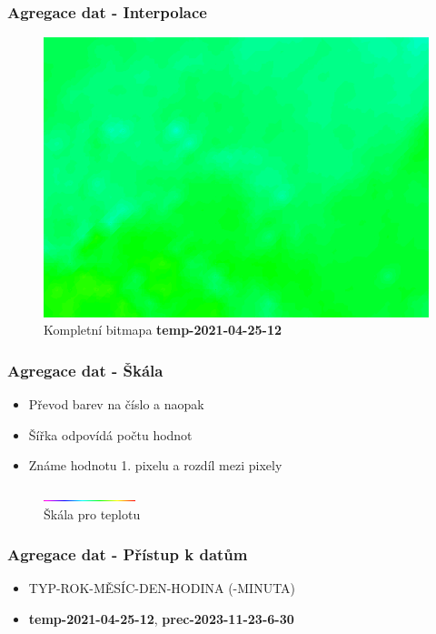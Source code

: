 \documentclass{beamer}
\begin{document}
	\begin{frame}
		\frametitle{Agregace dat - Interpolace}
		
		\begin{figure}
			
			\includegraphics[scale=0.5]{figures/bmp_vybarvena.png}
			\caption{Kompletní bitmapa \textbf{temp-2021-04-25-12}}
			
		\end{figure}
		
	\end{frame}

	\begin{frame}
		\frametitle{Agregace dat - Škála}
		
		\begin{itemize}
			\item Převod barev na číslo a naopak
			\item Šířka odpovídá počtu hodnot
			\item Známe hodnotu 1. pixelu a rozdíl mezi pixely
		\end{itemize}
		
		\begin{figure}
			
			\includegraphics[scale=3]{figures/scale_temp.png}
			\caption{Škála pro teplotu}
			
		\end{figure}
		
	\end{frame}

	\begin{frame}
		\frametitle{Agregace dat - Přístup k datům}
		
		\begin{itemize}
			\item TYP-ROK-MĚSÍC-DEN-HODINA (-MINUTA)
			\item \textbf{temp-2021-04-25-12}, \textbf{prec-2023-11-23-6-30}
		\end{itemize}
		
	\end{frame}
\end{document}
